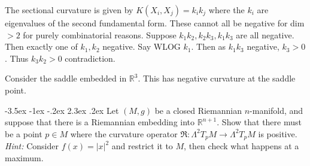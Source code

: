 \documentclass[10pt]{article}
\makeatletter
\renewcommand\section{\@startsection{section}{1}{\z@}%
                                  {-3.5ex \@plus -1ex \@minus -.2ex}%
                                  {2.3ex \@plus.2ex}%
                                  {\normalfont\large\bfseries}}
\newcommand{\R}{{\ensuremath{\mathbb{R}}} }
\newcommand{\hint}[1]{{\emph{Hint:} #1}} %
\makeatother
\begin{document}
The sectional curvature is given by $K(X_i,X_j) = k_ik_j$ where the $k_i$ are eigenvalues of the second fundamental form. These cannot all be negative for dim $>2$ for purely combinatorial reasons. Suppose $ k_1 k_2, k_2 k_3, k_1 k_3$ are all negative. Then exactly one of $k_1, k_2$ negative. Say WLOG $k_1$. Then as $k_1 k_3$ negative, $k_3 > 0$. Thus $k_3 k_2 > 0$ contradiction.

Consider the saddle embedded in $\R^3$. This has negative curvature at the saddle point.

\section{Let $(M,g)$ be a closed Riemannian $n$-manifold, and suppose 
that there is a Riemannian embedding into $\R^{n+1}$. Show that there must be a point $p \in M$ where the curvature operator $\mathfrak{R}: \Lambda^2 T_p M \to \Lambda^2 T_p M$ is positive. \hint{Consider $f(x) = |x|^2$ and restrict it to $M$, then check what happens at a maximum.}}
\end{document}
